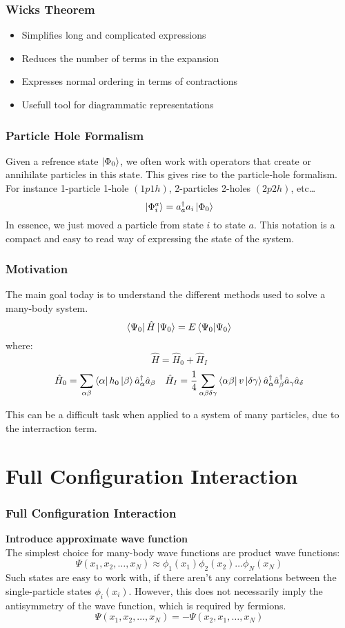 \documentclass[UKenglish,aspectratio=169,12pt]{beamer}
\begin{document}
\begin{frame}
    \frametitle{Wicks Theorem}
    
    \begin{itemize}
        \item Simplifies long and complicated expressions
        \item Reduces the number of terms in the expansion
        \item Expresses normal ordering in terms of contractions
        \item Usefull tool for diagrammatic representations
    \end{itemize}
\end{frame}

\begin{frame}
    \frametitle{Particle Hole Formalism}
    Given a refrence state $\ket{\Phi_0}$, we often work with operators that create or annihilate particles in this state. This gives rise to the particle-hole formalism.\\
    For instance 1-particle 1-hole $(1p 1h)$, 2-particles 2-holes $(2p 2h)$, etc\dots
    \[
        \ket{\Phi_i^a} = a^\dagger_a a_i \ket{\Phi_0}
    \]
    In essence, we just moved a particle from state $i$ to state $a$.
    This notation is a compact and easy to read way of expressing the state of the system.
\end{frame}

\begin{frame}
    \frametitle{Motivation}
    The main goal today is to understand the different methods used to solve a many-body system.
    \[
        \bra{\Psi_0} \hat{H} \ket{\Psi_0} = E \bra{\Psi_0} \ket{\Psi_0}
    \]
    where:
    \[
        \hat{H} = \hat{H}_0 + \hat{H}_I
    \]
    \[
    \hat{H}_0 = \sum_{\alpha \beta}^{}\bra{ \alpha} h_0 \ket{\beta} \hat{a}^\dagger_\alpha \hat{a}_\beta \quad \hat{H}_I= \frac{1}{4} \sum_{\alpha\beta\delta\gamma}^{}\bra{\alpha\beta} v \ket{\delta\gamma} \hat{a}^\dagger_\alpha \hat{a}^\dagger_\beta \hat{a}_\gamma \hat{a}_\delta
    \]

    This can be a difficult task when applied to a system of many particles, due to the interraction term.
\end{frame}

\section{Full Configuration Interaction}

\begin{frame}
    \frametitle{Full Configuration Interaction}
    \textbf{Introduce approximate wave function}\\
    The simplest choice for many-body wave functions are product wave functions:
    \[
        \Psi(x_1,x_2,\dots ,x_N) \approx \phi_1(x_1)\phi_2(x_2)\dots \phi_N(x_N)
    \]
    Such states are easy to work with, if there aren't any correlations between the single-particle states $\phi_i(x_i)$. 
    However, this does not necessarily imply the antisymmetry of the wave function, which is required by fermions. 
    \[
        \Psi(x_1,x_2,\dots ,x_N) = - \Psi(x_2,x_1,\dots ,x_N)
    \]
\end{frame}
\end{document}
